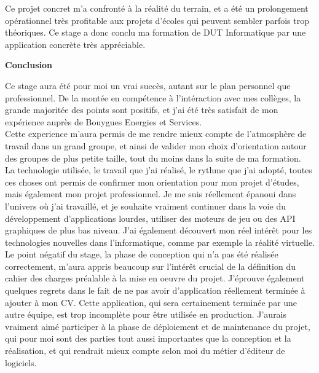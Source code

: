 \documentclass[a4paper]{article}
\begin{document}
    Ce projet concret m'a confronté à la réalité du terrain, et a été un prolongement opérationnel très profitable aux projets d'écoles qui peuvent sembler parfois trop théoriques. Ce stage a donc conclu ma formation de DUT Informatique par une application concrète très appréciable. \\

    \newpage

    \huge \textbf{Conclusion} \vspace{5pt} \\
   \normalsize
   
    Ce stage aura été pour moi un vrai succès, autant sur le plan personnel que professionnel. De la montée en compétence à l'intéraction avec mes collèges, la grande majoritée des points sont positifs, et j'ai été très satisfait de mon expérience auprès de Bouygues Energies et Services. \\

    Cette experience m'aura permis de me rendre mieux compte de l'atmosphère de travail dans un grand groupe, et ainsi de valider mon choix d'orientation autour des groupes de plus petite taille, tout du moins dans la suite de ma formation. \\

    La technologie utilisée, le travail que j'ai réalisé, le rythme que j'ai adopté, toutes ces choses ont permis de confirmer mon orientation pour mon projet d'études, mais également mon projet professionnel. Je me suis réellement épanoui dans l'univers où j'ai travaillé, et je souhaite vraiment continuer dans la voie du développement d'applications lourdes, utiliser des moteurs de jeu ou des API graphiques de plus bas niveau. J'ai également découvert mon réel intérêt pour les technologies nouvelles dans l'informatique, comme par exemple la réalité virtuelle. \\

    Le point négatif du stage, la phase de conception qui n'a pas été réalisée correctement, m'aura appris beaucoup sur l'intérêt crucial de la définition du cahier des charges préalable à la mise en oeuvre du projet. J'éprouve également quelques regrets dans le fait de ne pas avoir d'application réellement terminée à ajouter à mon CV. Cette application, qui sera certainement terminée par une autre équipe, est trop incomplète pour être utilisée en production. J'aurais vraiment aimé participer à la phase de déploiement et de maintenance du projet, qui pour moi sont des parties tout aussi importantes que la conception et la réalisation, et qui rendrait mieux compte selon moi du métier d'éditeur de logiciels. \\
\end{document}
